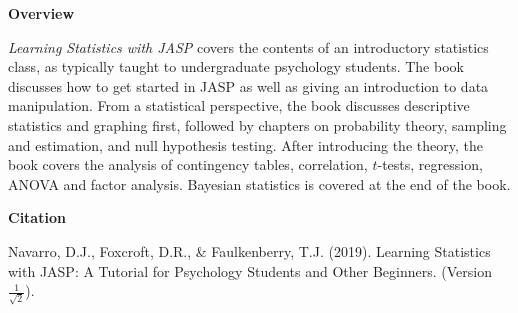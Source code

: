 

\clearpage
\newpage
\begin{center}
{\bf Overview}
\end{center}

\noindent
{\it Learning Statistics with JASP} covers the contents of an introductory statistics class, as typically taught to undergraduate psychology students. The book discusses how to get started in JASP as well as giving an introduction to data manipulation. From a statistical perspective, the book discusses descriptive statistics and graphing first, followed by chapters on probability theory, sampling and estimation, and null hypothesis testing. After introducing the theory, the book covers the analysis of contingency tables, correlation, $t$-tests, regression, ANOVA and factor analysis. Bayesian statistics is covered at the end of the book. 

\vspace{14cm}
\begin{center}
{\bf Citation}
\end{center}

\noindent
Navarro, D.J., Foxcroft, D.R., \& Faulkenberry, T.J. (2019). Learning Statistics with JASP: A Tutorial for Psychology Students and Other Beginners. (Version $\frac{1}{\sqrt{2}}$). 